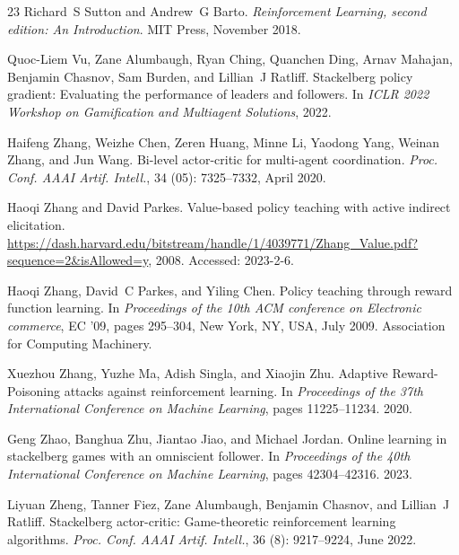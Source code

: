 \documentclass{acml}
\begin{document}
\begin{thebibliography}{23}
Richard~S Sutton and Andrew~G Barto.
\newblock \emph{Reinforcement Learning, second edition: An Introduction}.
\newblock MIT Press, November 2018.

Quoc-Liem Vu, Zane Alumbaugh, Ryan Ching, Quanchen Ding, Arnav Mahajan, Benjamin Chasnov, Sam Burden, and Lillian~J Ratliff.
\newblock Stackelberg policy gradient: Evaluating the performance of leaders and followers.
\newblock In \emph{ICLR 2022 Workshop on Gamification and Multiagent Solutions}, 2022.

Haifeng Zhang, Weizhe Chen, Zeren Huang, Minne Li, Yaodong Yang, Weinan Zhang, and Jun Wang.
\newblock Bi-level actor-critic for multi-agent coordination.
\newblock \emph{Proc. Conf. AAAI Artif. Intell.}, 34 (05): 7325--7332, April 2020{}.

Haoqi Zhang and David Parkes.
\newblock Value-based policy teaching with active indirect elicitation.
\newblock \url{https://dash.harvard.edu/bitstream/handle/1/4039771/Zhang_Value.pdf?sequence=2&isAllowed=y}, 2008.
\newblock Accessed: 2023-2-6.

Haoqi Zhang, David~C Parkes, and Yiling Chen.
\newblock Policy teaching through reward function learning.
\newblock In \emph{Proceedings of the 10th {ACM} conference on Electronic commerce}, EC '09, pages 295--304, New York, NY, USA, July 2009. Association for Computing Machinery.

Xuezhou Zhang, Yuzhe Ma, Adish Singla, and Xiaojin Zhu.
\newblock Adaptive {Reward-Poisoning} attacks against reinforcement learning.
\newblock In \emph{Proceedings of the 37th International Conference on Machine Learning}, pages 11225--11234. 2020{}.

Geng Zhao, Banghua Zhu, Jiantao Jiao, and Michael Jordan.
\newblock Online learning in stackelberg games with an omniscient follower.
\newblock In \emph{Proceedings of the 40th International Conference on Machine Learning}, pages 42304--42316. 2023.

Liyuan Zheng, Tanner Fiez, Zane Alumbaugh, Benjamin Chasnov, and Lillian~J Ratliff.
\newblock Stackelberg actor-critic: Game-theoretic reinforcement learning algorithms.
\newblock \emph{Proc. Conf. AAAI Artif. Intell.}, 36 (8): 9217--9224, June 2022.


\end{thebibliography}
\end{document}
